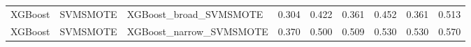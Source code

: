 \begin{tabular}{lllllllll}
                     XGBoost &            SVMSMOTE &                       XGBoost\_broad\_SVMSMOTE & 0.304 &                     0.422 &                 0.361 &                  0.452 &                                   0.361 &    0.513 \\
                     XGBoost &            SVMSMOTE &                      XGBoost\_narrow\_SVMSMOTE & 0.370 &                     0.500 &                 0.509 &                  0.530 &                                   0.530 &    0.570 \\
\bottomrule
\end{tabular}
